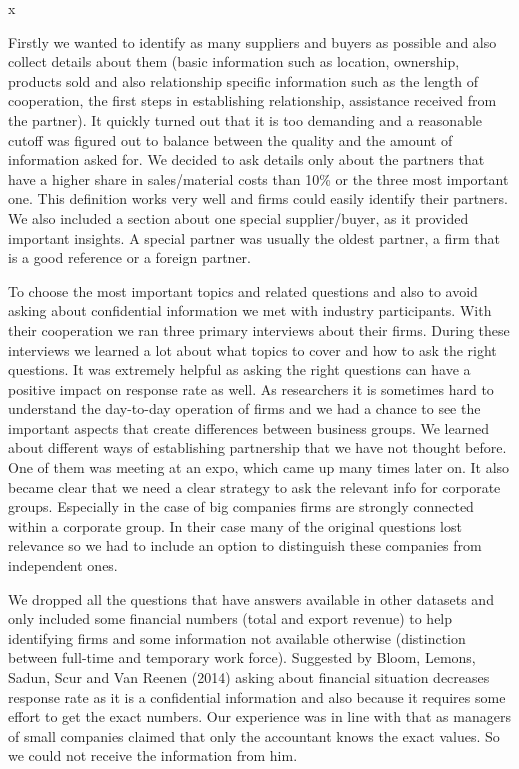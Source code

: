 x\documentclass[final, dvipsnames, authoryear,12pt]{elsarticle}
\begin{document}
Firstly we wanted to identify as many suppliers and buyers as possible and also collect details about them (basic information such as location, ownership, products sold and also relationship specific information such as the length of cooperation, the first steps in establishing relationship, assistance received from the partner). It quickly turned out that it is too demanding and a reasonable cutoff was figured out to balance between the quality and the amount of information asked for. We decided to ask details only about the partners that have a higher share in sales/material costs than 10\% or the three most important one. This definition works very well and firms could easily identify their partners. We also included a section about one special supplier/buyer, as it provided important insights. A special partner was usually the oldest partner, a firm that is a good reference or a foreign partner.

To choose the most important topics and related questions and also to avoid asking about confidential information we met with industry participants. With their cooperation we ran three primary interviews about their firms. During these interviews we learned a lot about what topics to cover and how to ask the right questions. It was extremely helpful as asking the right questions can have a positive impact on response rate as well. As researchers it is sometimes hard to understand the day-to-day operation of firms and we had a chance to see the important aspects that create differences between business groups. We learned about different ways of establishing partnership that we have not thought before. One of them was meeting at an expo, which came up many times later on. It also became clear that we need a clear strategy to ask the relevant info for corporate groups. Especially in the case of big companies firms are strongly connected within a corporate group. In their case many of the original questions lost relevance so we had to include an option to distinguish these companies from independent ones.

We dropped all the questions that have answers available in other datasets and only included some financial numbers (total and export revenue) to help identifying firms and some information not available otherwise (distinction between full-time and temporary work force). Suggested by Bloom, Lemons, Sadun, Scur and Van Reenen (2014) asking about financial situation decreases response rate as it is a confidential information and also because it requires some effort to get the exact numbers. Our experience was in line with that as managers of small companies claimed that only the accountant knows the exact values. So we could not receive the information from him.
\end{document}
